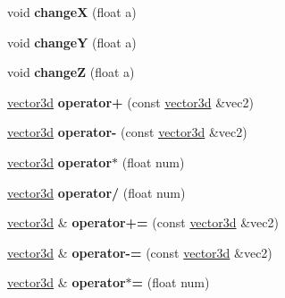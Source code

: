 \begin{DoxyCompactItemize}
\item 
\hypertarget{classvector3d_adf61ef91bd03d780fe9f45e235c86de7}{void {\bfseries change\+X} (float a)}\label{classvector3d_adf61ef91bd03d780fe9f45e235c86de7}

\item 
\hypertarget{classvector3d_a7bf36e5ab76c63fbb5e0ad12c9bc5cc6}{void {\bfseries change\+Y} (float a)}\label{classvector3d_a7bf36e5ab76c63fbb5e0ad12c9bc5cc6}

\item 
\hypertarget{classvector3d_a9ca79dc0f1b568a662fd5a8eb3f76f55}{void {\bfseries change\+Z} (float a)}\label{classvector3d_a9ca79dc0f1b568a662fd5a8eb3f76f55}

\item 
\hypertarget{classvector3d_a73d37762a7afbe2315fd0ad451d21dd0}{\hyperlink{classvector3d}{vector3d} {\bfseries operator+} (const \hyperlink{classvector3d}{vector3d} \&vec2)}\label{classvector3d_a73d37762a7afbe2315fd0ad451d21dd0}

\item 
\hypertarget{classvector3d_a61c6c2014ad2427738adb4eec4861702}{\hyperlink{classvector3d}{vector3d} {\bfseries operator-\/} (const \hyperlink{classvector3d}{vector3d} \&vec2)}\label{classvector3d_a61c6c2014ad2427738adb4eec4861702}

\item 
\hypertarget{classvector3d_aa0f925313df292af7455502ab7a5f5db}{\hyperlink{classvector3d}{vector3d} {\bfseries operator$\ast$} (float num)}\label{classvector3d_aa0f925313df292af7455502ab7a5f5db}

\item 
\hypertarget{classvector3d_a183486b28a2e4ecea182f073c53f7313}{\hyperlink{classvector3d}{vector3d} {\bfseries operator/} (float num)}\label{classvector3d_a183486b28a2e4ecea182f073c53f7313}

\item 
\hypertarget{classvector3d_a251ae5d24d2671e717c908d018cd0c9a}{\hyperlink{classvector3d}{vector3d} \& {\bfseries operator+=} (const \hyperlink{classvector3d}{vector3d} \&vec2)}\label{classvector3d_a251ae5d24d2671e717c908d018cd0c9a}

\item 
\hypertarget{classvector3d_a9ca8fac546649b1d388c36bd95e11bc0}{\hyperlink{classvector3d}{vector3d} \& {\bfseries operator-\/=} (const \hyperlink{classvector3d}{vector3d} \&vec2)}\label{classvector3d_a9ca8fac546649b1d388c36bd95e11bc0}

\item 
\hypertarget{classvector3d_aea75198d4c8daec23800b4986675297b}{\hyperlink{classvector3d}{vector3d} \& {\bfseries operator$\ast$=} (float num)}\label{classvector3d_aea75198d4c8daec23800b4986675297b}


\end{DoxyCompactItemize}
